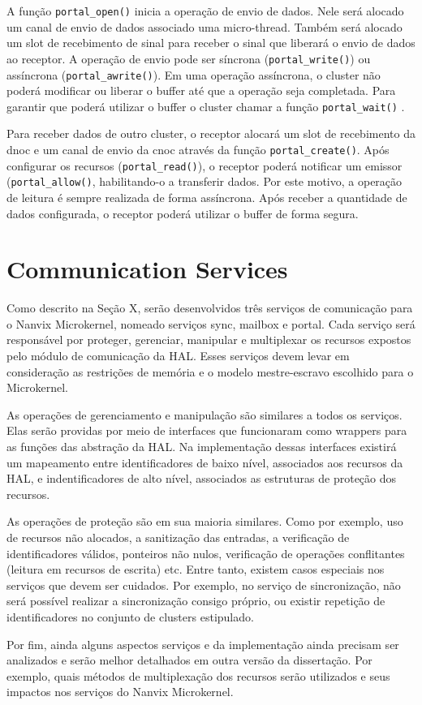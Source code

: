		A função \texttt{portal\_open()} inicia a operação de envio de dados.
		Nele será alocado um canal de envio de dados associado uma micro-thread.
		Também será alocado um slot de recebimento de sinal para receber o sinal que
		liberará o envio de dados ao receptor.
		A operação de envio pode ser síncrona (\texttt{portal\_write()}) ou assíncrona (\texttt{portal\_awrite()}).
		Em uma operação assíncrona, o cluster não poderá modificar ou liberar o buffer até
		que a operação seja completada.
		Para garantir que poderá utilizar o buffer o cluster chamar a função \texttt{portal\_wait()} .

		Para receber dados de outro cluster, o receptor alocará um slot de recebimento da dnoc
		e um canal de envio da cnoc através da função \texttt{portal\_create()}.
		Após configurar os recursos (\texttt{portal\_read()}), o receptor poderá
		notificar um emissor (\texttt{portal\_allow()}, habilitando-o a transferir dados.
		Por este motivo, a operação de leitura é sempre realizada de forma assíncrona.
		Após receber a quantidade de dados configurada, o receptor poderá utilizar o buffer de forma segura.

	\section{Communication Services}

		Como descrito na Seção X, serão desenvolvidos três serviços de comunicação
		para o Nanvix Microkernel, nomeado serviços sync, mailbox e portal.
		Cada serviço será responsável por proteger, gerenciar, manipular e multiplexar
		os recursos expostos pelo módulo de comunicação da HAL.
		Esses serviços devem levar em consideração as restrições de memória
		e o modelo mestre-escravo escolhido para o Microkernel.

		As operações de gerenciamento e manipulação são similares a todos
		os serviços.
		Elas serão providas por meio de interfaces que funcionaram
		como wrappers para as funções das abstração da HAL.
		Na implementação dessas interfaces existirá um mapeamento
		entre identificadores de baixo nível, associados aos recursos
		da HAL, e indentificadores de alto nível, associados as estruturas
		de proteção dos recursos.

		As operações de proteção são em sua maioria similares.
		Como por exemplo, uso de recursos não alocados, a sanitização das entradas,
		a verificação de identificadores válidos, ponteiros não nulos,
		verificação de operações conflitantes (leitura em recursos de escrita) etc.
		Entre tanto, existem casos especiais nos serviços que devem ser cuidados.
		Por exemplo, no serviço de sincronização, não será possível realizar
		a sincronização consigo próprio, ou existir repetição de identificadores
		no conjunto de clusters estipulado.

		Por fim, ainda alguns aspectos serviços e da implementação ainda precisam ser
		analizados e serão melhor detalhados em outra versão da dissertação.
		Por exemplo, quais métodos de multiplexação dos recursos serão utilizados
		e seus impactos nos serviços do Nanvix Microkernel.
